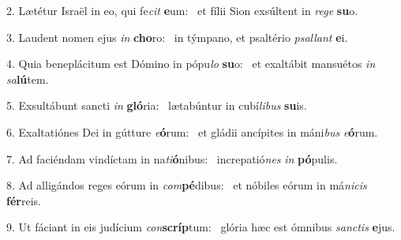 2. Lætétur Israël in eo, qui fe\textit{cit} \textbf{e}um: \ast\  et fílii Sion exsúltent in \textit{re}\textit{ge} \textbf{su}o.\

3. Laudent nomen ejus \textit{in} \textbf{cho}ro: \ast\  in týmpano, et psaltério \textit{psal}\textit{lant} \textbf{e}i.\

4. Quia beneplácitum est Dómino in pópu\textit{lo} \textbf{su}o: \ast\  et exaltábit mansuétos \textit{in} \textit{sa}\textbf{lú}tem.\

5. Exsultábunt sancti \textit{in} \textbf{gló}ria: \ast\  lætabúntur in cubí\textit{li}\textit{bus} \textbf{su}is.\

6. Exaltatiónes Dei in gútture \textit{e}\textbf{ó}rum: \ast\  et gládii ancípites in máni\textit{bus} \textit{e}\textbf{ó}rum.\

7. Ad faciéndam vindíctam in na\textit{ti}\textbf{ó}nibus: \ast\  increpatió\textit{nes} \textit{in} \textbf{pó}pulis.\

8. Ad alligándos reges eórum in \textit{com}\textbf{pé}dibus: \ast\  et nóbiles eórum in má\textit{ni}\textit{cis} \textbf{fér}reis.\

9. Ut fáciant in eis judícium \textit{con}\textbf{scríp}tum: \ast\  glória hæc est ómnibus \textit{sanc}\textit{tis} \textbf{e}jus.\

